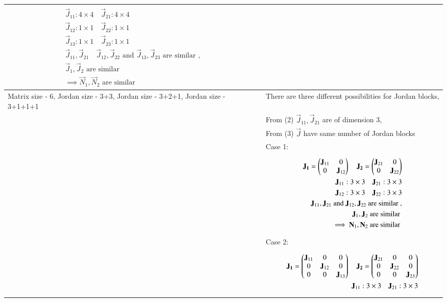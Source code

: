 \documentclass[journal,12pt]{IEEEtran}
\begin{document}
\begin{longtable}{|p{5cm}|p{13cm}|}
{\begin{align*}
    \vec{J}_{11}: 4\times4 \quad \vec{J}_{21}: 4\times4\\
    \vec{J}_{12}: 1\times1 \quad \vec{J}_{22}: 1\times1\\
    \vec{J}_{13}: 1\times1 \quad \vec{J}_{23}: 1\times1\\
    \vec{J}_{11}, \vec{J}_{21}\quad \vec{J}_{12}, \vec{J}_{22}  \text{ and } \vec{J}_{13}, \vec{J}_{23} \text{ are similar }, \\
    \vec{J}_{1}, \vec{J}_{2} \text{ are similar }\\
    \implies \vec{N}_{1}, \vec{N}_{2} \text{ are similar }
\end{align*}}\\
\hline
Matrix size - 6, Jordan size - 3+3, Jordan size - 3+2+1, Jordan size - 3+1+1+1 & There are three different possibilities for Jordan blocks,
\\& From (2) $\vec{J}_{11}, \vec{J}_{21} $ are of dimension 3, \\& From (3) $\vec{J}$ have same number of Jordan blocks
\\& Case 1: 
\\&
\parbox{12cm}{\begin{align*}
    \mathbf{J_1}=\begin{pmatrix}\mathbf{J}_{11} & 0 \\ 0&\mathbf{J}_{12}\end{pmatrix} \quad \mathbf{J_2}=\begin{pmatrix}\mathbf{J}_{21} & 0 \\ 0&\mathbf{J}_{22}\end{pmatrix}\\
    \mathbf{J}_{11}: 3\times3 \quad \mathbf{J}_{21}: 3\times3\\
    \mathbf{J}_{12}: 3\times3 \quad \mathbf{J}_{22}: 3\times3\\
    \mathbf{J}_{11}, \mathbf{J}_{21} \text{ and } \mathbf{J}_{12}, \mathbf{J}_{22} \text{ are similar }, \\
    \mathbf{J}_{1}, \mathbf{J}_{2} \text{ are similar }\\
    \implies \mathbf{N}_{1}, \mathbf{N}_{2} \text{ are similar }
\end{align*}}
\\& Case 2: 
\\&
\parbox{12cm}{\begin{align*}
    \vec{J_1}=\myvec{\vec{J}_{11} & 0&0 \\ 0&\vec{J}_{12}&0\\0&0&\vec{J}_{13}} \quad \vec{J_2}=\myvec{\vec{J}_{21} & 0&0 \\ 0&\vec{J}_{22}&0\\0&0&\vec{J}_{23}}\\
    \vec{J}_{11}: 3\times3 \quad \vec{J}_{21}: 3\times3\\

\end{align*}}
\end{longtable}
\end{document}

